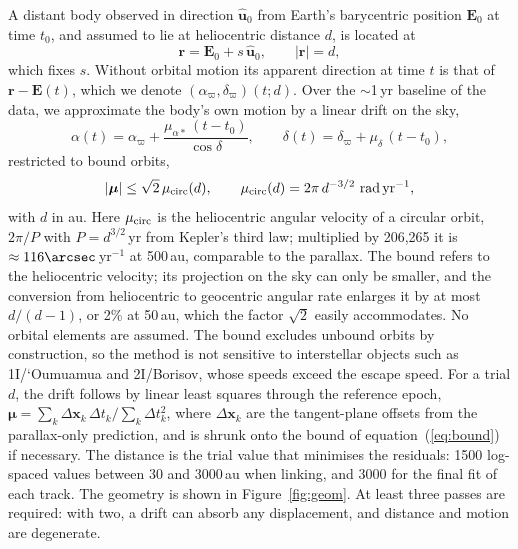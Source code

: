 \documentclass[twocolumn,linenumbers,anonymous]{aastex702}
\begin{document}
A distant body observed in direction $\hat{\mathbf{u}}_0$ from Earth's barycentric position $\mathbf{E}_0$ at time $t_0$, and assumed to lie at heliocentric distance $d$, is located at
\begin{equation}
\mathbf{r} = \mathbf{E}_0 + s\,\hat{\mathbf{u}}_0, \qquad |\mathbf{r}| = d,
\end{equation}
which fixes $s$. Without orbital motion its apparent direction at time $t$ is that of $\mathbf{r} - \mathbf{E}(t)$, which we denote $(\alpha_\varpi, \delta_\varpi)(t; d)$. Over the $\sim$1\,yr baseline of the data, we approximate the body's own motion by a linear drift on the sky,
\begin{equation}
\alpha (t) = \alpha_\varpi + \frac{\mu_{\alpha*}\,(t - t_0)}{\cos\delta}, \qquad \delta(t) = \delta_\varpi + \mu_\delta\,(t - t_0),
\label{eq:drift}
\end{equation}
restricted to bound orbits,
\begin{equation}
|\boldsymbol{\mu}| \le \sqrt{2}\,\mu_{\rm circ}(d), \qquad \mu_{\rm circ}(d) = 2\pi\,d^{-3/2}\ \mathrm{rad\,yr^{-1}},
\label{eq:bound}
\end{equation}
with $d$ in au. Here $\mu_{\rm circ}$ is the heliocentric angular velocity of a circular orbit, $2\pi/P$ with $P = d^{3/2}$\,yr from Kepler's third law; multiplied by 206{,}265 it is $\approx 116\arcsec$\,yr$^{-1}$ at 500\,au, comparable to the parallax. The bound refers to the heliocentric velocity; its projection on the sky can only be smaller, and the conversion from heliocentric to geocentric angular rate enlarges it by at most $d/(d-1)$, or 2\% at 50\,au, which the factor $\sqrt{2}$ easily accommodates. No orbital elements are assumed. The bound excludes unbound orbits by construction, so the method is not sensitive to interstellar objects such as 1I/`Oumuamua and 2I/Borisov, whose speeds exceed the escape speed. For a trial $d$, the drift follows by linear least squares through the reference epoch, $\boldsymbol{\mu} = \sum_k \Delta\mathbf{x}_k\,\Delta t_k / \sum_k \Delta t_k^2$, where $\Delta\mathbf{x}_k$ are the tangent-plane offsets from the parallax-only prediction, and is shrunk onto the bound of equation~(\ref{eq:bound}) if necessary. The distance is the trial value that minimises the residuals: 1500 log-spaced values between 30 and 3000\,au when linking, and 3000 for the final fit of each track. The geometry is shown in Figure~\ref{fig:geom}. At least three passes are required: with two, a drift can absorb any displacement, and distance and motion are degenerate.
\end{document}
